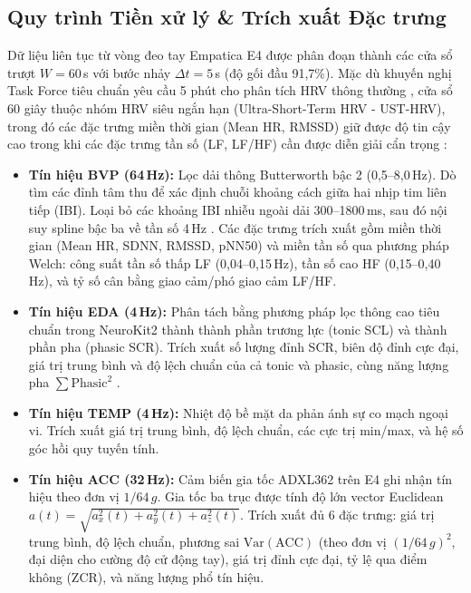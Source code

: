 \documentclass[conference]{IEEEtran}
\begin{document}
\subsection{Quy trình Tiền xử lý \& Trích xuất Đặc trưng}
Dữ liệu liên tục từ vòng đeo tay Empatica E4 được phân đoạn thành các cửa sổ trượt $W = 60$\,s với bước nhảy $\Delta t = 5$\,s (độ gối đầu 91,7\%). Mặc dù khuyến nghị Task Force tiêu chuẩn yêu cầu 5 phút cho phân tích HRV thông thường \cite{taskforce1996heart}, cửa sổ 60 giây thuộc nhóm HRV siêu ngắn hạn (Ultra-Short-Term HRV - UST-HRV), trong đó các đặc trưng miền thời gian (Mean HR, RMSSD) giữ được độ tin cậy cao trong khi các đặc trưng tần số (LF, LF/HF) cần được diễn giải cẩn trọng \cite{castaldo2015acute}:
\begin{itemize}
    \item \textbf{Tín hiệu BVP (64\,Hz):} Lọc dải thông Butterworth bậc 2 (0,5--8,0\,Hz). Dò tìm các đỉnh tâm thu để xác định chuỗi khoảng cách giữa hai nhịp tim liên tiếp (IBI). Loại bỏ các khoảng IBI nhiễu ngoài dải 300--1800\,ms, sau đó nội suy spline bậc ba về tần số 4\,Hz \cite{tarvainen2014kubios}. Các đặc trưng trích xuất gồm miền thời gian (Mean HR, SDNN, RMSSD, pNN50) và miền tần số qua phương pháp Welch: công suất tần số thấp LF (0,04--0,15\,Hz), tần số cao HF (0,15--0,40\,Hz), và tỷ số cân bằng giao cảm/phó giao cảm LF/HF.
    \item \textbf{Tín hiệu EDA (4\,Hz):} Phân tách bằng phương pháp lọc thông cao tiêu chuẩn trong NeuroKit2 \cite{makowski2021neurokit2, boucsein2012electrodermal} thành thành phần trương lực (tonic SCL) và thành phần pha (phasic SCR). Trích xuất số lượng đỉnh SCR, biên độ đỉnh cực đại, giá trị trung bình và độ lệch chuẩn của cả tonic và phasic, cùng năng lượng pha $\sum \text{Phasic}^2$ \cite{boucsein2012electrodermal}.
    \item \textbf{Tín hiệu TEMP (4\,Hz):} Nhiệt độ bề mặt da phản ánh sự co mạch ngoại vi. Trích xuất giá trị trung bình, độ lệch chuẩn, các cực trị min/max, và hệ số góc hồi quy tuyến tính.
    \item \textbf{Tín hiệu ACC (32\,Hz):} Cảm biến gia tốc ADXL362 trên E4 ghi nhận tín hiệu theo đơn vị $1/64\,g$. Gia tốc ba trục được tính độ lớn vector Euclidean $a(t) = \sqrt{a_x^2(t) + a_y^2(t) + a_z^2(t)}$. Trích xuất đủ 6 đặc trưng: giá trị trung bình, độ lệch chuẩn, phương sai $\text{Var}(\text{ACC})$ (theo đơn vị $(1/64\,g)^2$, đại diện cho cường độ cử động tay), giá trị đỉnh cực đại, tỷ lệ qua điểm không (ZCR), và năng lượng phổ tín hiệu.
\end{itemize}
\end{document}

